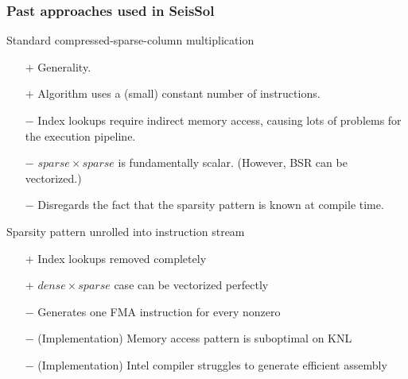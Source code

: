 \documentclass[9pt]{beamer}
\begin{document}
\begin{frame}
  \frametitle{Past approaches used in SeisSol}
  \begin{block}{Standard compressed-sparse-column multiplication}
    \begin{itemize}
      \item[$+$] Generality.
      \item[$+$] Algorithm uses a (small) constant number of instructions.
      \item[$-$] Index lookups require indirect memory access, causing lots of problems for the execution pipeline.
      \item[$-$] $sparse \times sparse$ is fundamentally scalar. (However, BSR can be vectorized.)
      \item[$-$] Disregards the fact that the sparsity pattern is known at compile time.
    \end{itemize}
  \end{block}

  \begin{block}{Sparsity pattern unrolled into instruction stream}
    \begin{itemize}
    \item[$+$] Index lookups removed completely
    \item[$+$] $dense \times sparse$ case can be vectorized perfectly 
    \item[$-$] Generates one FMA instruction for every nonzero
    \item[$-$] (Implementation) Memory access pattern is suboptimal on KNL
    \item[$-$] (Implementation) Intel compiler struggles to generate efficient assembly
    \end{itemize}
  \end{block}
\end{frame}
\end{document}
